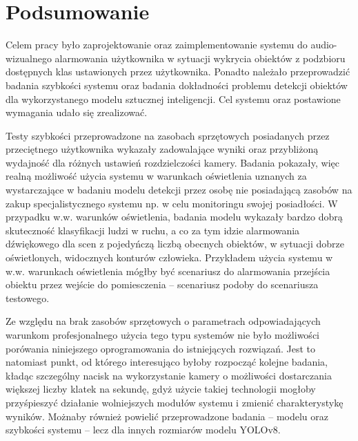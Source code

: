 \chapter{Podsumowanie}
\label{chap:podsumowanie}
Celem pracy było zaprojektowanie oraz zaimplementowanie systemu do audio-wizualnego alarmowania użytkownika w sytuacji wykrycia obiektów z podzbioru dostępnych klas ustawionych przez użytkownika. Ponadto należało przeprowadzić badania szybkości systemu oraz badania dokładności problemu detekcji obiektów dla wykorzystanego modelu sztucznej inteligencji.
Cel systemu oraz postawione wymagania udało się zrealizować.


Testy szybkości przeprowadzone na zasobach sprzętowych posiadanych przez przeciętnego użytkownika wykazały zadowalające wyniki oraz przybliżoną wydajność dla różnych ustawień rozdzielczości kamery. Badania pokazały, więc realną możliwość użycia systemu w warunkach oświetlenia uznanych za wystarczające w badaniu modelu detekcji przez osobę nie posiadającą zasobów na zakup specjalistycznego systemu np. w celu monitoringu swojej posiadłości.
W przypadku w.w. warunków oświetlenia, badania modelu wykazały bardzo dobrą skuteczność klasyfikacji ludzi w ruchu, a co za tym idzie alarmowania dźwiękowego dla scen z pojedyńczą liczbą obecnych obiektów, w sytuacji dobrze oświetlonych, widocznych konturów człowieka. Przykładem użycia systemu w w.w. warunkach oświetlenia mógłby być scenariusz do alarmowania przejścia obiektu przez wejście do pomiesczenia -- scenariusz podoby do scenariusza testowego.  


Ze względu na brak zasobów sprzętowych o parametrach odpowiadających warunkom profesjonalnego użycia tego typu systemów nie było możliwości porówania niniejszego oprogramowania do istniejących rozwiązań. Jest to natomiast punkt, od którego interesująco byłoby rozpocząć kolejne badania, kładąc szczególny nacisk na wykorzystanie kamery o możliwości dostarczania większej liczby klatek na sekundę, gdyż użycie takiej technologii mogłoby przyśpieszyć działanie wolniejszych modułów systemu i zmienić charakterystykę wyników. Możnaby również powielić przeprowadzone badania -- modelu oraz szybkości systemu -- lecz dla innych rozmiarów modelu YOLOv8.  


